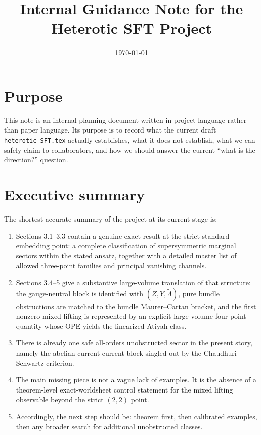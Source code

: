 \documentclass[11pt]{article}
\title{Internal Guidance Note for the Heterotic SFT Project}
\author{}
\date{\today}
\newcommand{\wt}[1]{\widetilde{#1}}
\begin{document}
\maketitle

\section{Purpose}

This note is an internal planning document written in project language rather than paper language. Its purpose is to record what the current draft \texttt{heterotic\_SFT.tex} actually establishes, what it does not establish, what we can safely claim to collaborators, and how we should answer the current ``what is the direction?'' question.

\section{Executive summary}

The shortest accurate summary of the project at its current stage is:
\begin{enumerate}
\item Sections 3.1--3.3 contain a genuine exact result at the strict standard-embedding point: a complete classification of supersymmetric marginal sectors within the stated ansatz, together with a detailed master list of allowed three-point families and principal vanishing channels.
\item Sections 3.4--5 give a substantive large-volume translation of that structure: the gauge-neutral block is identified with $(Z,Y,\wt\Lambda)$, pure bundle obstructions are matched to the bundle Maurer--Cartan bracket, and the first nonzero mixed lifting is represented by an explicit large-volume four-point quantity whose OPE yields the linearized Atiyah class.
\item There is already one safe all-orders unobstructed sector in the present story, namely the abelian current-current block singled out by the Chaudhuri--Schwartz criterion.
\item The main missing piece is not a vague lack of examples. It is the absence of a theorem-level exact-worldsheet control statement for the mixed lifting observable beyond the strict $(2,2)$ point.
\item Accordingly, the next step should be: theorem first, then calibrated examples, then any broader search for additional unobstructed classes.
\end{enumerate}
\end{document}
